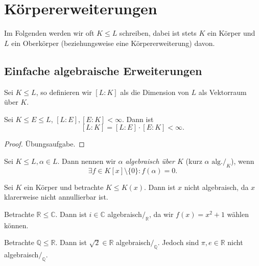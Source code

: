 \section{Körpererweiterungen}

Im Folgenden werden wir oft $K \leq L$ schreiben, dabei ist stets $K$ ein Körper und $L$ ein Oberkörper (beziehungsweise eine Körpererweiterung) davon.

\subsection{Einfache algebraische Erweiterungen}

\begin{definition}
    Sei $K \leq L$, so definieren wir $[L:K]$ als die Dimension von $L$ als Vektorraum über $K$.
\end{definition}

\begin{theorem}[Gradsatz]
    Sei $K \leq E \leq L$, $[L:E],[E:K] < \infty$. Dann ist
    $$ [L:K] = [L:E] \cdot [E:K] < \infty. $$
\end{theorem}

\begin{proof}
    Übungsaufgabe.
\end{proof}

\begin{definition}
    Sei $K \leq L, \alpha \in L$. Dann nennen wir \emph{$\alpha$ algebraisch über $K$} (kurz $\alpha \text{ alg.}/_K$), wenn
    $$ \exists f \in K[x] \setminus \{0\}: f(\alpha) = 0. $$
\end{definition}

\begin{example}
    Sei $K$ ein Körper und betrachte $K \leq K(x)$. Dann ist $x$ nicht algebraisch, da $x$ klarerweise nicht annullierbar ist.
\end{example}

\begin{example}
    Betrachte $\mathbb{R} \leq \mathbb{C}$. Dann ist $i \in \mathbb{C}$ algebraisch$/_\mathbb{R}$, da wir $f(x) = x^2 + 1$ wählen können.
\end{example}

\begin{example}
    Betrachte $\mathbb{Q} \leq \mathbb{R}$. Dann ist $\sqrt{2} \in \mathbb{R}$ algebraisch$/_\mathbb{Q}$. Jedoch sind $\pi, e \in \mathbb{R}$ nicht algebraisch$/_\mathbb{Q}$.
\end{example}

